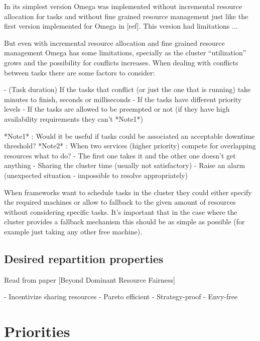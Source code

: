 \documentclass{svjour3}                     %
\begin{document}
In its simplest version Omega was implemented without incremental resource allocation for 
tasks and without fine grained resource management just like the first version implemented
for Omega in [ref]. This version had limitations ... 

But even with incremental resource allocation and fine grained resource management Omega
has some limitations, specially as the cluster ``utilization'' grows and the possibility for 
conflicts increases. When dealing with conflicts between tasks there are some factors to consider:

 - (Task duration) If the tasks that conflict (or just the one that is running) take
   minutes to finish, seconds or milliseconds
 - If the tasks have different priority levels
 - If the tasks are allowed to be preempted or not (if they have high availability 
   requirements they can't *Note1*)
   



   
*Note1* : Would it be useful if tasks could be associated an acceptable downtime threshold?
*Note2* : When two services (higher priority) compete for overlapping resources what to do?
 - The first one takes it and the other one doesn't get anything
 - Sharing the cluster time (usually not satisfactory)
 - Raise an alarm (unexpected situation - impossible to resolve appropriately)
 
When frameworks want to schedule tasks in the cluster they could either specify the required
machines or allow to fallback to the given amount of resources without considering specific
tasks. It's important that in the case where the cluster provides a fallback mechanism 
this should be as simple as possible (for example just taking any other free machine).




\subsection{Desired repartition properties}

Read from  paper [Beyond Dominant Resource Fairness]

- Incentivize sharing resources
- Pareto efficient
- Strategy-proof
- Envy-free


\section{Priorities}
\end{document}
